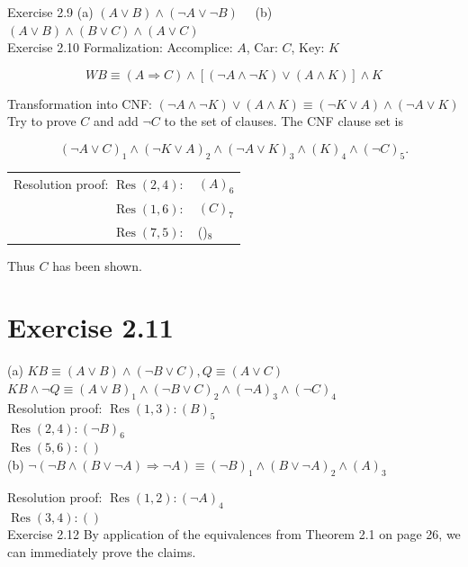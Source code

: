 \documentclass[10pt]{article}
\begin{document}
Exercise 2.9 (a) $(A \vee B) \wedge(\neg A \vee \neg B) \quad$ (b) $(A \vee B) \wedge(B \vee C) \wedge(A \vee C)$\\
Exercise 2.10 Formalization: Accomplice: $A$, Car: $C$, Key: $K$

$$
W B \equiv(A \Rightarrow C) \wedge[(\neg A \wedge \neg K) \vee(A \wedge K)] \wedge K
$$

Transformation into CNF: $(\neg A \wedge \neg K) \vee(A \wedge K) \equiv(\neg K \vee A) \wedge(\neg A \vee K)$\\
Try to prove $C$ and add $\neg C$ to the set of clauses. The CNF clause set is

$$
(\neg A \vee C)_{1} \wedge(\neg K \vee A)_{2} \wedge(\neg A \vee K)_{3} \wedge(K)_{4} \wedge(\neg C)_{5} .
$$

\begin{center}
\begin{tabular}{rl}
Resolution proof: $\operatorname{Res}(2,4):$ & $(A)_{6}$ \\
$\operatorname{Res}(1,6):$ & $(C)_{7}$ \\
$\operatorname{Res}(7,5):$ & ()$_{8}$ \\
\end{tabular}
\end{center}

Thus $C$ has been shown.

\section*{Exercise 2.11}
(a) $K B \equiv(A \vee B) \wedge(\neg B \vee C), Q \equiv(A \vee C)$\\
$K B \wedge \neg Q \equiv(A \vee B)_{1} \wedge(\neg B \vee C)_{2} \wedge(\neg A)_{3} \wedge(\neg C)_{4}$\\
Resolution proof: $\operatorname{Res}(1,3):(B)_{5}$\\
$\operatorname{Res}(2,4):(\neg B)_{6}$\\
$\operatorname{Res}(5,6):()$\\
(b) $\neg(\neg B \wedge(B \vee \neg A) \Rightarrow \neg A) \equiv(\neg B)_{1} \wedge(B \vee \neg A)_{2} \wedge(A)_{3}$

Resolution proof: $\operatorname{Res}(1,2):(\neg A)_{4}$\\
$\operatorname{Res}(3,4):()$\\
Exercise 2.12 By application of the equivalences from Theorem 2.1 on page 26, we can immediately prove the claims.
\end{document}
